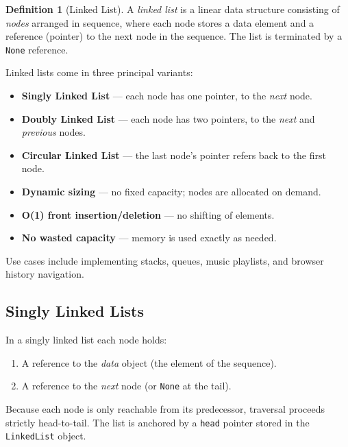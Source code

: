 \documentclass[11pt, a4paper, notitlepage]{report}
\theoremstyle{definition}
\newtheorem{definition}[theorem]{Definition}
\theoremstyle{remark}
\theoremstyle{definition}
\begin{document}
\begin{definition}[Linked List]
A \emph{linked list} is a linear data structure consisting of \emph{nodes}
arranged in sequence, where each node stores a data element and a reference
(pointer) to the next node in the sequence. The list is terminated by a
\texttt{None} reference.
\end{definition}

Linked lists come in three principal variants:
\begin{itemize}
  \item \textbf{Singly Linked List} --- each node has one pointer, to the
        \emph{next} node.
  \item \textbf{Doubly Linked List} --- each node has two pointers, to the
        \emph{next} and \emph{previous} nodes.
  \item \textbf{Circular Linked List} --- the last node's pointer refers back
        to the first node.
\end{itemize}

\begin{keyresult}[title={Key Result: Advantages of Linked Lists}]
\begin{itemize}
  \item \textbf{Dynamic sizing} --- no fixed capacity; nodes are allocated on
        demand.
  \item \textbf{O(1) front insertion/deletion} --- no shifting of elements.
  \item \textbf{No wasted capacity} --- memory is used exactly as needed.
\end{itemize}
Use cases include implementing stacks, queues, music playlists, and browser
history navigation.
\end{keyresult}

\subsection{Singly Linked Lists}
\label{subsec:singly-ll}

In a singly linked list each node holds:
\begin{enumerate}
  \item A reference to the \emph{data} object (the element of the sequence).
  \item A reference to the \emph{next} node (or \texttt{None} at the tail).
\end{enumerate}

Because each node is only reachable from its predecessor, traversal proceeds
strictly head-to-tail. The list is anchored by a \texttt{head} pointer stored
in the \texttt{LinkedList} object.
\end{document}
